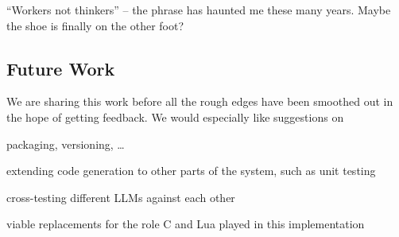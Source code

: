 \documentclass[letterpaper,12pt]{article}
\begin{document}
  ``Workers not thinkers'' --
  the phrase has haunted me these many years. Maybe the shoe is finally on the
  other foot?
  \ee

\subsection{Future Work}

We are sharing this work before all the rough edges have been smoothed 
out in the hope of getting feedback. We would especially like suggestions on
\be
\item packaging, versioning, \ldots
\item extending code generation to other parts of the system, such as unit
  testing
\item cross-testing different LLMs against each other
\item viable replacements for the role C and Lua played in this implementation
  \ee



\appendix


\end{document}
